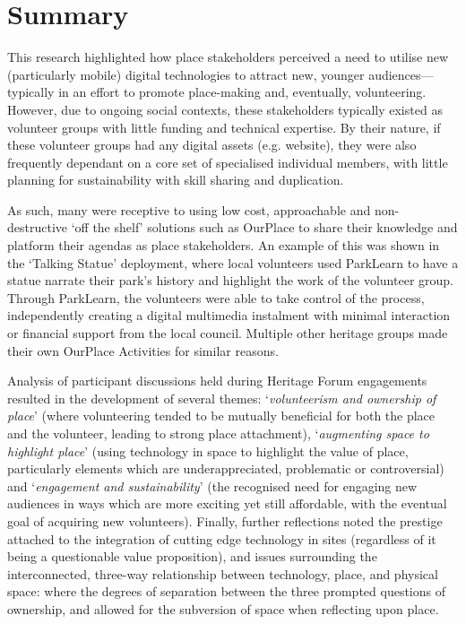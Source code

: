 \section{Summary}
This research highlighted how place stakeholders perceived a need to utilise new (particularly mobile) digital technologies to attract new, younger audiences---typically in an effort to promote place-making and, eventually, volunteering. However, due to ongoing social contexts, these stakeholders typically existed as volunteer groups with little funding and technical expertise. By their nature, if these volunteer groups had any digital assets (e.g. website), they were also frequently dependant on a core set of specialised individual members, with little planning for sustainability with skill sharing and duplication.

As such, many were receptive to using low cost, approachable and non-destructive `off the shelf' solutions such as OurPlace to share their knowledge and platform their agendas as place stakeholders. An example of this was shown in the `Talking Statue' deployment, where local volunteers used ParkLearn to have a statue narrate their park's history and highlight the work of the volunteer group. Through ParkLearn, the volunteers were able to take control of the process, independently creating a digital multimedia instalment with minimal interaction or financial support from the local council. Multiple other heritage groups made their own OurPlace Activities for similar reasons.

Analysis of participant discussions held during Heritage Forum engagements resulted in the development of several themes: `\textit{volunteerism and ownership of place}' (where volunteering tended to be mutually beneficial for both the place and the volunteer, leading to strong place attachment), `\textit{augmenting space to highlight place}' (using technology in space to highlight the value of place, particularly elements which are underappreciated, problematic or controversial) and `\textit{engagement and sustainability}' (the recognised need for engaging new audiences in ways which are more exciting yet still affordable, with the eventual goal of acquiring new volunteers). Finally, further reflections noted the prestige attached to the integration of cutting edge technology in sites (regardless of it being a questionable value proposition), and issues surrounding the interconnected, three-way relationship between technology, place, and physical space: where the degrees of separation between the three prompted questions of ownership, and allowed for the subversion of space when reflecting upon place.